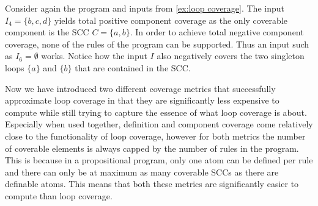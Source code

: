 \begin{example}
\label{ex:component coverage}
    Consider again the program and inputs from \cref{ex:loop coverage}. The input \(I_4 = \{b, c, d\}\) yields total positive component coverage as the only coverable component is the SCC \(C = \{a, b\}\). In order to achieve total negative component coverage, none of the rules of the program can be supported. Thus an input such as \(I_6 = \emptyset\) works. Notice how the input $I$ also negatively covers the two singleton loops \(\{a\}\) and \(\{b\}\) that are contained in the SCC.
\end{example}

Now we have introduced two different coverage metrics that successfully approximate loop coverage in that they are significantly less expensive to compute while still trying to capture the essence of what loop coverage is about. Especially when used together, definition and component coverage come relatively close to the functionality of loop coverage, however for both metrics the number of coverable elements is always capped by the number of rules in the program. This is because in a propositional program, only one atom can be defined per rule and there can only be at maximum as many coverable SCCs as there are definable atoms. This means that both these metrics are significantly easier to compute than loop coverage.


\begin{comment}
    - strongly connected components are the maximal loops of the program, therefore this is an approximation of loop coverage       \/  
    
    - Definition + example      \/
    
    - Definition of negative coverage is different from loop coverage! \/
    
    - because of this different definition positive/negative component coverage of a specific component implies positive/negative loop 
    coverage for all subset loops of the component (would not be the case for negative coverage if definition is different)     \/
    
    (- total positive loop coverage implies total positive component coverage, however this is not true for negative coverage because 
    of the different definition (see above)     \/
    
    - total program coverage implies total component coverage)  \/

    (- with the help of definition coverage one could redefine loop and component coverage based on definition coverage)

    - both definition coverage and component coverage are capped on the number of rules in the program      \/
\end{comment}

